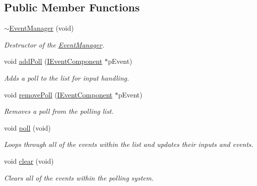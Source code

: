 \subsection*{Public Member Functions}
\begin{DoxyCompactItemize}
\item 
\hyperlink{classsparky_1_1_event_manager_ade55e783a41959ef2055121ca6e28827}{$\sim$\+Event\+Manager} (void)
\begin{DoxyCompactList}\small\item\em Destructor of the \hyperlink{classsparky_1_1_event_manager}{Event\+Manager}. \end{DoxyCompactList}\item 
void \hyperlink{classsparky_1_1_event_manager_abdaa1524ebc322309dd7968f45d77e95}{add\+Poll} (\hyperlink{classsparky_1_1_i_event_component}{I\+Event\+Component} $\ast$p\+Event)
\begin{DoxyCompactList}\small\item\em Adds a poll to the list for input handling. \end{DoxyCompactList}\item 
void \hyperlink{classsparky_1_1_event_manager_a637d2c2270e10a2ac097e5e41e4036cf}{remove\+Poll} (\hyperlink{classsparky_1_1_i_event_component}{I\+Event\+Component} $\ast$p\+Event)
\begin{DoxyCompactList}\small\item\em Removes a poll from the polling list. \end{DoxyCompactList}\item 
void \hyperlink{classsparky_1_1_event_manager_a18cf5b89a4d9bcbd1d2b2e4f21111ffc}{poll} (void)\hypertarget{classsparky_1_1_event_manager_a18cf5b89a4d9bcbd1d2b2e4f21111ffc}{}\label{classsparky_1_1_event_manager_a18cf5b89a4d9bcbd1d2b2e4f21111ffc}

\begin{DoxyCompactList}\small\item\em Loops through all of the events within the list and updates their inputs and events. \end{DoxyCompactList}\item 
void \hyperlink{classsparky_1_1_event_manager_af6a92d67955623ba25ed5f1612e9b88e}{clear} (void)\hypertarget{classsparky_1_1_event_manager_af6a92d67955623ba25ed5f1612e9b88e}{}\label{classsparky_1_1_event_manager_af6a92d67955623ba25ed5f1612e9b88e}

\begin{DoxyCompactList}\small\item\em Clears all of the events within the polling system. \end{DoxyCompactList}\end{DoxyCompactItemize}
